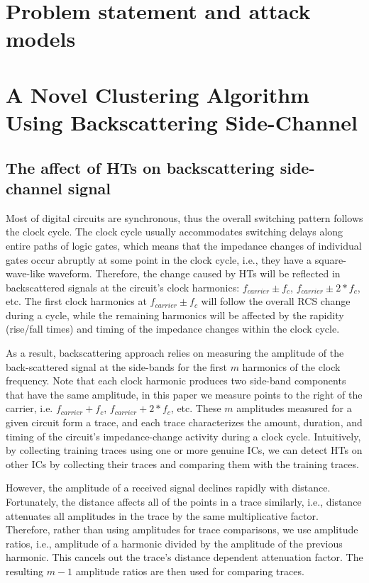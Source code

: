 \documentclass[journal]{IEEEtran}
\begin{document}
\section{Problem statement and attack models} \label{problem}

\section{A Novel Clustering Algorithm Using Backscattering Side-Channel} \label{agorithm}
\label{sec:identify}
\subsection{The affect of HTs on backscattering side-channel signal}
Most of digital circuits are synchronous, thus the overall switching pattern follows the clock cycle. The clock cycle usually accommodates switching delays along entire paths of logic gates, which means that the impedance changes of individual gates occur abruptly at some point in the clock cycle, i.e., they have a square-wave-like waveform. 
Therefore, the change caused by HTs will be reflected in backscattered signals at the circuit's clock harmonics: $f_{carrier} \pm f_c$, $f_{carrier} \pm 2*f_c$, etc. The first clock harmonics at $f_{carrier} \pm f_c$ will follow the overall RCS change during a cycle, while the remaining
harmonics will be affected by the rapidity (rise/fall times)
and timing of the impedance changes within the clock cycle.

As a result, backscattering approach relies on measuring the amplitude of the
back-scattered signal at the side-bands for the first $m$ harmonics of the clock frequency. Note that each clock harmonic produces two side-band
components that have the same amplitude, in this paper we
measure points to the right of the carrier, i.e. $f_{carrier} + f_c$,
$f_{carrier} + 2*f_c$, etc. These $m$ amplitudes measured for a given circuit form a
trace, and each trace characterizes the amount, duration, and timing of the circuit's impedance-change activity during a
clock cycle. Intuitively, by collecting
training traces using one or more genuine ICs, we can detect HTs on other ICs by collecting their traces and comparing them with the training traces.

However, the amplitude of a received signal declines rapidly
with distance. Fortunately, the distance affects all of the points in a trace
similarly, i.e., distance attenuates all amplitudes in the trace
by the same multiplicative factor. Therefore, rather than using
amplitudes for trace comparisons, we use amplitude ratios,
i.e., amplitude of a harmonic divided by the amplitude of the previous harmonic. This cancels out the trace's distance dependent
attenuation factor. The resulting $m - 1$ amplitude
ratios are then used for comparing traces.
\end{document}
